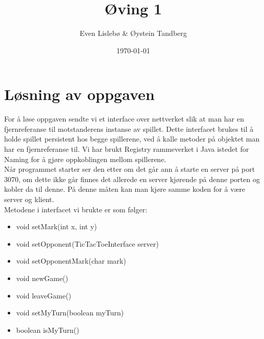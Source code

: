 \documentclass{article}
\begin{document}
\title{Øving 1}
\author{Even Lislebø \& Øystein Tandberg}
\date{\today}
\maketitle

\section*{Løsning av oppgaven}
For å løse oppgaven sendte vi et interface over nettverket slik at man har en fjernreferanse til motstanderens instanse av spillet. Dette interfacet brukes til å holde spillet persistent hos begge spillerene, ved å kalle metoder på objektet man har en fjernreferanse til. Vi har brukt Registry rammeverket i Java istedet for Naming for å gjøre oppkoblingen mellom spillerene.\\

Når programmet starter ser den etter om det går ann å starte en server på port 3070, om dette ikke går finnes det allerede en server kjørende på denne porten og kobler da til denne. På denne måten kan man kjøre samme koden for å være server og klient.\\

Metodene i interfacet vi brukte er som følger:
\begin{itemize}

\item void setMark(int x, int y)
\item void setOpponent(TicTacToeInterface server)
\item void setOpponentMark(char mark)
\item void newGame()
\item void leaveGame()
\item void setMyTurn(boolean myTurn)
\item boolean isMyTurn()
\end{itemize}
\end{document}
